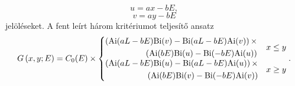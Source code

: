 \begin{equation}
	u = ax-bE,
\end{equation}
\begin{equation}
	v = ay-bE
\end{equation}
jelöléseket. A fent leírt három kritériumot teljesítő ansatz 
\begin{equation}
	G\left(x,y;E\right) = C_0(E)\times
	\begin{cases}
		\begin{split}
			\left(\mathrm{Ai}(aL-bE)\mathrm{Bi}(v)-\mathrm{Bi}(aL-bE)\mathrm{Ai}(v)\right)\times\\
			\left(\mathrm{Ai}(bE)\mathrm{Bi}(u)-\mathrm{Bi}(-bE)\mathrm{Ai}(u)\right)
		\end{split}& x \leq y\\
		\begin{split}
			\left(\mathrm{Ai}(aL-bE)\mathrm{Bi}(u)-\mathrm{Bi}(aL-bE)\mathrm{Ai}(u)\right)\times\\
			\left(\mathrm{Ai}(bE)\mathrm{Bi}(v)-\mathrm{Bi}(-bE)\mathrm{Ai}(v)\right)
		\end{split}& x \geq y
	\end{cases}.
\end{equation}
